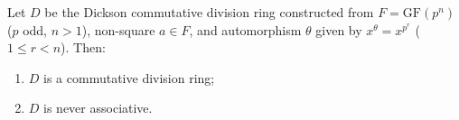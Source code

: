 Let $D$ be the Dickson commutative division ring constructed from $F = \mathrm{GF}(p^n)$ ($p$ odd, $n > 1$), non-square $a \in F$, and automorphism $\theta$ given by $x^\theta = x^{p^r}$ ($1 \leq r < n$). Then:
\begin{enumerate}
\item $D$ is a commutative division ring;
\item $D$ is never associative.
\end{enumerate}